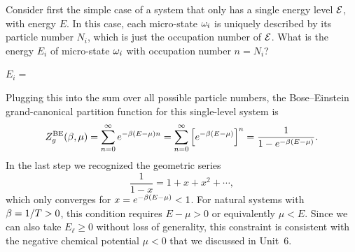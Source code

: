 Consider first the simple case of a system that only has a single energy level $\mathcal E$, with energy $E$.
In this case, each micro-state $\omega_i$ is uniquely described by its particle number $N_i$, which is just the occupation number of $\mathcal E$.
What is the energy $E_i$ of micro-state $\omega_i$ with occupation number $n = N_i$?
\begin{mdframed}
  $E_i = $ \\[24 pt]
\end{mdframed}

Plugging this into the sum over all possible particle numbers, the Bose--Einstein grand-canonical partition function for this single-level system is
\begin{equation}
  \label{eq:BEsingle}
  Z_g^{\text{BE}}(\beta, \mu) = \sum_{n = 0}^{\infty} e^{-\beta (E - \mu) n} = \sum_{n = 0}^{\infty} \left[e^{-\beta (E - \mu)}\right]^n = \frac{1}{1 - e^{-\beta (E - \mu)}}.
\end{equation}
In the last step we recognized the geometric series
\begin{equation*}
  \frac{1}{1 - x} = 1 + x + x^2 + \cdots,
\end{equation*}
which only converges for $x = e^{-\beta (E - \mu)} < 1$.
For natural systems with $\beta = 1 / T > 0$, this condition requires $E - \mu > 0$ or equivalently $\mu < E$.
Since we can also take $E_{\ell} \geq 0$ without loss of generality, this constraint is consistent with the negative chemical potential $\mu < 0$ that we discussed in Unit~6.

